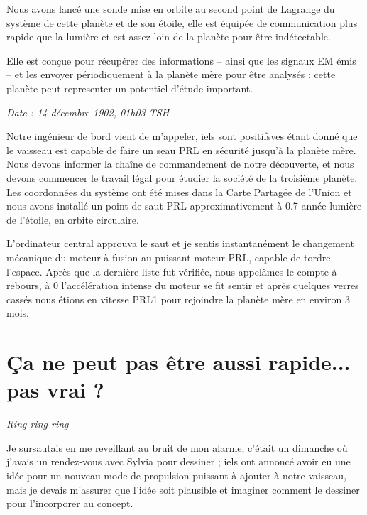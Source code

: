 \documentclass[12pt,hidelinks,a4paper]{book}
\renewcommand{\cdot}{\textperiodcentered}
\begin{document}
Nous avons lancé une sonde mise en orbite au second point de Lagrange
du système de cette planète et de son étoile, elle est équipée de
communication plus rapide que la lumière et est assez loin de la planète
pour être indétectable.\par
\bigskip

Elle est conçue pour récupérer des informations -- ainsi que les
signaux EM émis -- et les envoyer périodiquement à la planète mère
pour être analysés ; cette planète peut representer un potentiel d'étude
important.\par
\bigskip

\textit{Date : 14 décembre 1902, 01h03 TSH}\par

Notre ingénieur de bord vient de m'appeler, iels sont positifs\cdot ves
étant donné que le vaisseau est capable de faire un seau PRL en sécurité
jusqu'à la planète mère. Nous devons informer la chaîne de commandement
de notre découverte, et nous devons commencer le travail légal pour
étudier la société de la troisième planète. Les coordonnées du système
ont été mises dans la Carte Partagée de l'Union et nous avons installé
un point de saut PRL approximativement à 0.7 année lumière de l'étoile,
en orbite circulaire.\par

\bigskip

L'ordinateur central approuva le saut et je sentis instantanément
le changement mécanique du moteur à fusion au puissant moteur PRL,
capable de tordre l'espace. Après que la dernière liste fut vérifiée,
nous appelâmes le compte à rebours, à 0 l'accélération intense du
moteur se fit sentir et après quelques verres cassés nous étions en
vitesse PRL1 pour rejoindre la planète mère en environ 3 mois.\par
\bigskip

\chapter{Ça ne peut pas être aussi rapide... pas vrai ?}

\textit{Ring ring ring}

Je sursautais en me reveillant au bruit de mon alarme, c'était un
dimanche où j'avais un rendez-vous avec Sylvia pour dessiner ; iels
ont annoncé avoir eu une idée pour un nouveau mode de propulsion puissant
à ajouter à notre vaisseau, mais je devais m'assurer que l'idée soit
plausible et imaginer comment le dessiner pour l'incorporer au concept.\par
\end{document}

